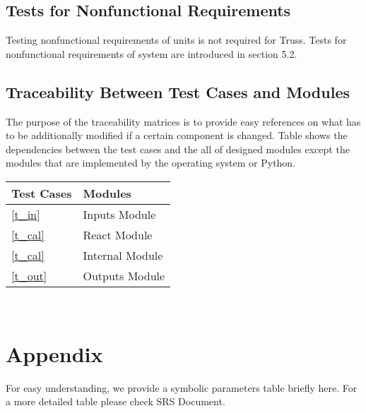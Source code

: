 \documentclass[12pt, titlepage]{article}
\begin{document}
\subsection{Tests for Nonfunctional Requirements}
Testing nonfunctional requirements of units is not required for Truss. Tests
for nonfunctional requirements of system are introduced in section 5.2.

\subsection{Traceability Between Test Cases and Modules}
The purpose of the traceability matrices is to provide easy references on what
has to be additionally modified if a certain component is changed. Table 
shows the dependencies between the test cases and the all of designed modules except the modules that are implemented by the operating system or Python.


\begin{tabular}{l l} 
  \toprule		
  \textbf{Test Cases} & \textbf{Modules}\\
  \midrule 
  
   \ref{t_in}& Inputs Module\\
  \ref{t_cal} & React Module\\
  \ref{t_cal} & Internal Module\\
  \ref{t_out} & Outputs Module\\

  
\bottomrule
\end{tabular}\\


				




\newpage

\section{Appendix}

For easy understanding, we provide a symbolic parameters table briefly here. For a more detailed table please check SRS Document.
\end{document}
